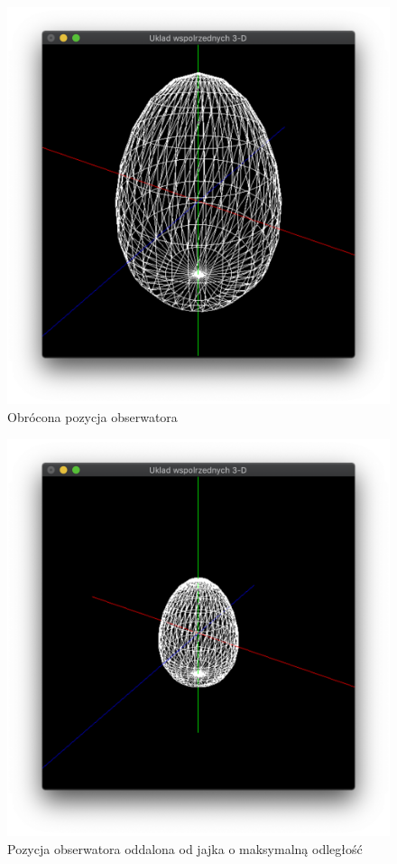 \documentclass[12pt,a4paper,titlepage]{article}
\begin{document}
\begin{figure}[H]
\centering
\includegraphics[width = 14cm]{images/rotated.png}
\caption{Obrócona pozycja obserwatora}
\label{fig:egg_rotated}
\end{figure}

\begin{figure}[H]
\centering
\includegraphics[width = 14cm]{images/zoomed_out.png}
\caption{Pozycja obserwatora oddalona od jajka o maksymalną odległość}
\label{fig:egg_zoomed_out}
\end{figure}
\end{document}
